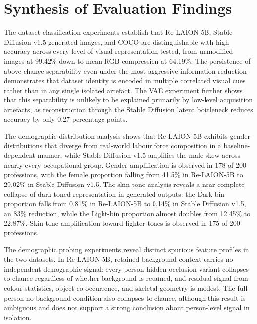 \section{Synthesis of Evaluation Findings}
\label{sec:overall_conclusions}

The dataset classification experiments establish that Re-LAION-5B, Stable Diffusion v1.5 generated images, and COCO are distinguishable with high accuracy across every level of visual representation tested, from unmodified images at 99.42\% down to mean RGB compression at 64.19\%. The persistence of above-chance separability even under the most aggressive information reduction demonstrates that dataset identity is encoded in multiple correlated visual cues rather than in any single isolated artefact. The VAE experiment further shows that this separability is unlikely to be explained primarily by low-level acquisition artefacts, as reconstruction through the Stable Diffusion latent bottleneck reduces accuracy by only 0.27 percentage points.

The demographic distribution analysis shows that Re-LAION-5B exhibits gender distributions that diverge from real-world labour force composition in a baseline-dependent manner, while Stable Diffusion v1.5 amplifies the male skew across nearly every occupational group. Gender amplification is observed in 178 of 200 professions, with the female proportion falling from 41.5\% in Re-LAION-5B to 29.02\% in Stable Diffusion v1.5. The skin tone analysis reveals a near-complete collapse of dark-toned representation in generated outputs: the Dark-bin proportion falls from 0.81\% in Re-LAION-5B to 0.14\% in Stable Diffusion v1.5, an 83\% reduction, while the Light-bin proportion almost doubles from 12.45\% to 22.87\%. Skin tone amplification toward lighter tones is observed in 175 of 200 professions.

The demographic probing experiments reveal distinct spurious feature profiles in the two datasets. In Re-LAION-5B, retained background context carries no independent demographic signal: every person-hidden occlusion variant collapses to chance regardless of whether background is retained, and residual signal from colour statistics, object co-occurrence, and skeletal geometry is modest. The full-person-no-background condition also collapses to chance, although this result is ambiguous and does not support a strong conclusion about person-level signal in isolation.

